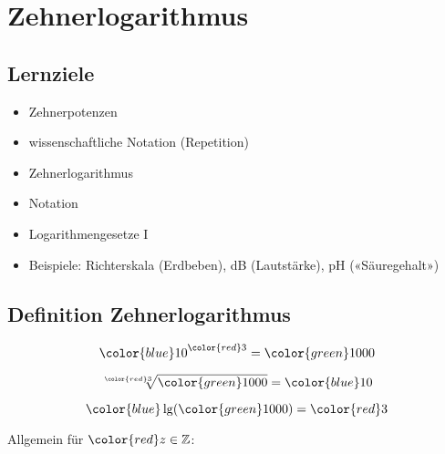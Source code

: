 
\section{Zehnerlogarithmus}


\subsection*{Lernziele}

\begin{itemize}
\item Zehnerpotenzen
\item wissenschaftliche Notation (Repetition)
\item Zehnerlogarithmus
\item Notation
\item Logarithmengesetze I
\item Beispiele: Richterskala (Erdbeben), dB (Lautstärke), pH («Säuregehalt»)
\end{itemize}

\fi{}%
\newpage

\subsection{Definition Zehnerlogarithmus}
$${\color{blue}10}^{\color{red}3} = {\color{green}1000}$$

$$\sqrt[{\color{red}3}]{{\color{green}1000}} = {\color{blue}10}$$

$${\color{blue}\lg}({\color{green}1000}) = {\color{red}3}$$

Allgemein für ${\color{red}z}\in \mathbb{Z}$:

\begin{center}
\end{center}


